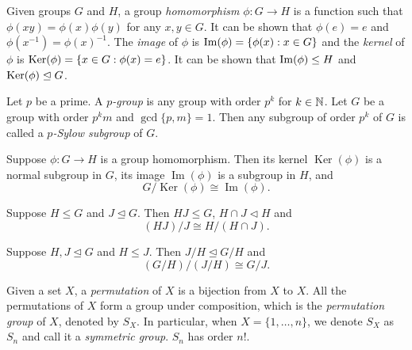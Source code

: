 \begin{definition}
	Given groups $G$ and $H$, a group \textit{homomorphism} $\phi: G \to H$ is a function such that $\phi(xy) = \phi(x) \phi(y)$ for any $x, y \in G$. It can be shown that $\phi(e) = e$ and $\phi(x^{-1}) = \phi(x) ^ {-1}$. The \textit{image} of $\phi$ is $\operatorname{Im}(\phi) = \{\phi(x) : x\in G\}$ and the \textit{kernel} of $\phi$ is $\operatorname{Ker}(\phi) = \{x \in G : \phi(x) = e\}$. It can be shown that $\operatorname{Im}(\phi) \le H$ and $\operatorname{Ker}(\phi) \trianglelefteq G$.  
\end{definition}

\begin{definition} \label{def:p-group}
	Let $p$ be a prime. A \textit{$p$-group} is any group with order $p^k$ for $k \in \mathbb N$. Let $G$ be a group with order $p^k m$ and $\gcd\{p, m\} = 1$. Then any subgroup of order $p^k$ of $G$ is called a \textit{$p$-Sylow subgroup} of $G$. 
\end{definition}

\begin{theorem} \label{thm:first-iso}
	Suppose $\phi: G \to H$ is a group homomorphism. Then its kernel $\operatorname{Ker}(\phi)$ is a normal subgroup in $G$, its image $\operatorname{Im}(\phi)$ is a subgroup in $H$, and 
	$$
	G / \operatorname{Ker}(\phi) \cong \operatorname{Im}(\phi).
	$$
\end{theorem}

\begin{theorem} \label{thm:second-iso}
	Suppose $H \le G$ and $J \trianglelefteq G$. Then $HJ \le G$, $H \cap J \triangleleft H$ and $$
	(HJ) / J \cong H / (H \cap J). 
	$$
\end{theorem}
\begin{theorem} \label{thm:third-iso}
	Suppose $H, J \trianglelefteq G$ and $H \le J$. Then $J/H \trianglelefteq G/H$ and $$
	(G/H)/(J/H) \cong G / J.    $$
\end{theorem}

\begin{definition}  \label{def:permutation}
	Given a set $X$, a \textit{permutation} of $X$ is a bijection from $X$ to $X$. All the permutations of $X$ form a group under composition, which is the \textit{permutation group} of $X$, denoted by $S_X$. In particular, when $X = \{1, \dots, n\}$, we denote $S_X$ as $S_n$ and call it a \textit{symmetric group}. $S_n$ has order $n!$. 
\end{definition}

